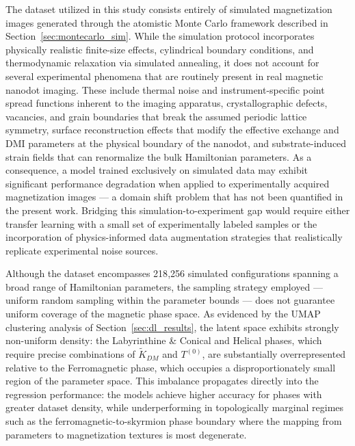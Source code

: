 \documentclass[final,5p,times,twocolumn]{elsarticle}
\begin{document}
The dataset utilized in this study consists entirely 
of simulated magnetization images generated through 
the atomistic Monte Carlo framework described in 
Section~\ref{sec:montecarlo_sim}. While the 
simulation protocol incorporates physically realistic 
finite-size effects, cylindrical boundary conditions, 
and thermodynamic relaxation via simulated annealing, 
it does not account for several experimental 
phenomena that are routinely present in real magnetic 
nanodot imaging. These include thermal noise and 
instrument-specific point spread functions inherent 
to the imaging apparatus, crystallographic defects, 
vacancies, and grain boundaries that break the 
assumed periodic lattice symmetry, surface 
reconstruction effects that modify the effective 
exchange and DMI parameters at the physical boundary 
of the nanodot, and substrate-induced strain fields 
that can renormalize the bulk Hamiltonian parameters. 
As a consequence, a model trained exclusively on 
simulated data may exhibit significant performance 
degradation when applied to experimentally acquired 
magnetization images --- a domain shift problem 
that has not been quantified in the present work. 
Bridging this simulation-to-experiment gap would 
require either transfer learning with a small set 
of experimentally labeled samples or the 
incorporation of physics-informed data augmentation 
strategies that realistically replicate experimental 
noise sources.

Although the dataset encompasses 218{,}256 simulated 
configurations spanning a broad range of Hamiltonian 
parameters, the sampling strategy employed --- 
uniform random sampling within the parameter 
bounds --- does not guarantee uniform coverage of 
the magnetic phase space. As evidenced by the UMAP 
clustering analysis of Section~\ref{sec:dl_results}, 
the latent space exhibits strongly non-uniform 
density: the Labyrinthine \& Conical and Helical 
phases, which require precise combinations of 
$\tilde{K}_{DM}$ and $T^{(0)}$, are substantially 
overrepresented relative to the Ferromagnetic phase, 
which occupies a disproportionately small region of 
the parameter space. This imbalance propagates 
directly into the regression performance: the models 
achieve higher accuracy for phases with greater 
dataset density, while underperforming in 
topologically marginal regimes such as the 
ferromagnetic-to-skyrmion phase boundary where 
the mapping from parameters to magnetization 
textures is most degenerate.
\end{document}
